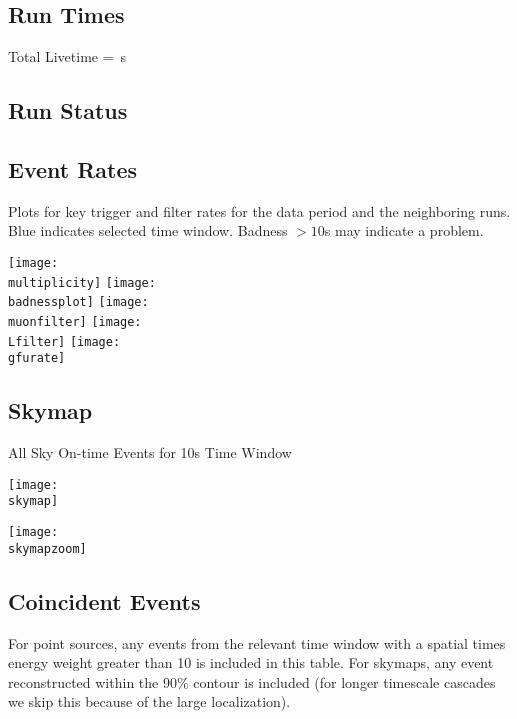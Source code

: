\documentclass[titlepage]{article}
\begin{document}
\subsection{Run Times}
\runtimetable

Total Livetime = \livetime\,s

\subsection{Run Status}
\runstatustable

\pagebreak
\subsection{Event Rates}
Plots for key trigger and filter rates for the data period
and the neighboring runs.  Blue indicates selected time window.
Badness $>10$s may indicate a problem.

\vspace{1em}
{
 \centering        
 \texttt{[image: \\multiplicity]}
 \texttt{[image: \\badnessplot]}
 \texttt{[image: \\muonfilter]}
 \texttt{[image: \\Lfilter]}
 \texttt{[image: \\gfurate]}
}


%
%
%
%
%
%
%

\pagebreak
\subsection{Skymap}

{
  \centering
  {\Large All Sky On-time Events for 10s Time Window}

  \texttt{[image: \\skymap]}

  \texttt{[image: \\skymapzoom]}
  
}
\pagebreak


\subsection{Coincident Events}
For point sources, any events from the relevant time window with a spatial times energy weight greater than 10 is included in this table. For skymaps, any event reconstructed within the 90\% contour is included (for longer timescale cascades we skip this because of the large localization). 
\event
\end{document}
